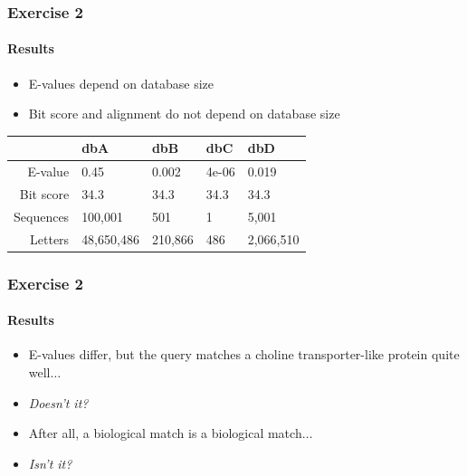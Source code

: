 \documentclass[table]{beamer}
\begin{document}
  \begin{frame}
    \frametitle{Exercise 2}
    \framesubtitle{Results}
    \begin{itemize}
      \item E-values depend on database size
      \item Bit score and alignment do not depend on database size
    \end{itemize}
    \begin{center}
	\begin{tabular}{r|l|l|l|l}
	   & dbA & dbB & dbC & dbD \\
	  \hline
	  \hline
	  E-value & 0.45 & 0.002 & 4e-06 & 0.019 \\
	  Bit score & 34.3 & 34.3 & 34.3 & 34.3 \\
	  \hline
	  Sequences & 100,001 & 501 & 1 & 5,001 \\
	  Letters & 48,650,486 & 210,866 & 486 & 2,066,510 	  
	\end{tabular}
    \end{center}
  \end{frame}

  \begin{frame}
    \frametitle{Exercise 2}
    \framesubtitle{Results}    
    \begin{itemize}
      \item<1-> E-values differ, but the query matches a choline transporter-like 
protein quite well$\ldots$
      \item<2-> \emph{Doesn't it?}
      \item<1-> After all, a biological match is a biological match$\ldots$
      \item<2-> \emph{Isn't it?}
    \end{itemize}
  \end{frame}
\end{document}

